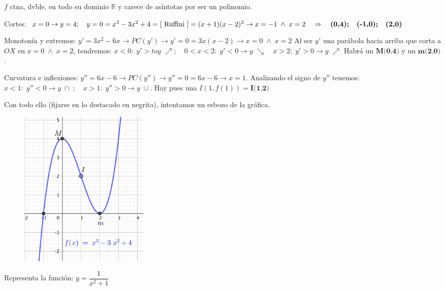 \begin{proofw}\renewcommand{\qedsymbol}{$\diamond$}	

$f$ ctna, dvble, en todo su dominio $\mathbb R$ y carece de asíntotas por ser un polinomio.


Cortes: $x=0 \to y=4; \quad y=0=x^3-3x^2+4 = [\mbox{ Ruffini }]=(x+1)(x-2)^2 \to x=-1 \; \wedge \; x=2 \quad \Rightarrow \quad \textbf {(0,4); \; (-1,0); \; (2,0)}$

\begin{multicols}{2}
Monotonía y extremos: $y'=3x^2-6x \to PC(y')\to y'=0=3x(x-2) \to x=0 \; \wedge \; x=2$ Al ser $y'$ una parábola hacia arriba que corta a $OX$ en $x=0 \; \wedge \; x=2$, tendremos:  $x<0: \;y'> to y\; \nearrow; \quad 0<x<2: \; y'<0 \to y\; \searrow \quad x>2; \; y'>0 \to y\; \nearrow$ Habrá un { $\textbf{M(0,4)}$} y un $\textbf{m(2,0)}$.

Curvatura e inflexiones: $y''=6x-6  \to PC(y'') \to y''=0=6x-6 \to x=1$. Analizando el signo de $y''$ tenemos: $x<1:	\; y''<0 \to y\; \cap \; ; \quad x>1:\; y''>0 \to y\; \cup$. Hay pues una $I(1,f(1))= \textbf{I(1,2)}$

Con todo ello (fijarse en lo destacado en negrita), intentamos un esbozo de la gráfica.
	
		\begin{figure}[H]
			\centering
			\includegraphics[width=0.3\textwidth]{imagenes/imagenes05/T05IM30.png}
		\end{figure}
\end{multicols}
	
\end{proofw}


\begin{ejre} Representa la función: $y=\dfrac {1}{x^2+1}$
	
\end{ejre}

